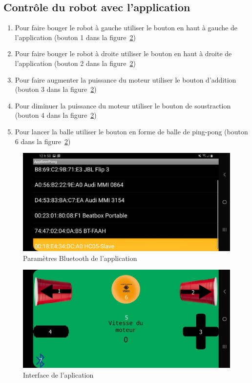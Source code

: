 \subsection{Contrôle du robot avec l’application}

\begin{enumerate}
    \item Pour faire bouger le robot à gauche utiliser le bouton en haut à gauche de l’application (bouton 1 dans la figure~\ref{fig:a1-Application})
    \item Pour faire bouger le robot à droite utiliser le bouton en haut à droite de l’application (bouton 2 dans la figure~\ref{fig:a1-Application})
    \item Pour faire augmenter la puissance du moteur utiliser le bouton d’addition (bouton 3 dans la figure~\ref{fig:a1-Application})
    \item Pour diminuer la puissance du moteur utiliser le bouton de soustraction (bouton 4 dans la figure~\ref{fig:a1-Application})
    \item Pour lancer la balle utiliser le bouton en forme de balle de ping-pong (bouton 6 dans la figure~\ref{fig:a1-Application})
\end{enumerate}


\begin{figure}[h!]
    \centering
    \includegraphics[width=0.6\linewidth]{img/a1/app-Bluethooth}
    \caption{Paramètres Bluetooth de l'application}
    \label{fig:a1-app-Bluethooth}
\end{figure}

\begin{figure}[h!]
    \centering
    \includegraphics[width=0.6\linewidth]{img/a1/Application}
    \caption{Interface de l'aplication}
    \label{fig:a1-Application}
\end{figure}
